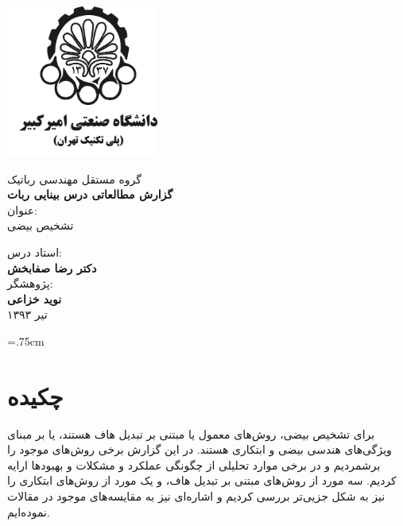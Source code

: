 \documentclass[12pt,a4paper]{article}
\numberwithin{equation}{section}
\numberwithin{figure}{section}
\newcommand{\nocontentsline}[3]{}
\newcommand{\tocless}[2]{\bgroup\let\addcontentsline=\nocontentsline#1{#2}\egroup}
\theoremstyle{definition}
\theoremstyle{theorem}
\theoremstyle{definition}
\begin{document}
\thispagestyle{empty}
\vspace*{-28mm}
\centerline{\includegraphics[height=5cm]{logo.png}}
\begin{center}
\vspace{-6mm}

گروه مستقل مهندسی رباتیک
\\[1.5cm]

{\large
\textbf { 
گزارش مطالعاتی درس بینایی ربات
}
\\[1.2cm]
عنوان:
\\[.4cm]
}
\baselineskip=1cm
{\Large \titr
تشخیص بیضی
\\[1cm]
}

{\Large \titr
{}
\vspace{-9mm}
}

{\large
استاد درس:
}
\\[.3cm]
\textbf{\large {\nastaliq دکتر رضا صفابخش}}
\\[.5cm]

{\large
 پژوهشگر:
}
\\[.3cm]
\textbf{\large {\nastaliq نوید خزاعی}}
\\[.5cm]
{\large
تیر ۱۳۹۳
}
\end{center}
\newpage
\baselineskip=1cm

\baselineskip=.75cm
\newpage 
{}
\tocless {\section*}{چکیده}

برای تشخیص بیضی، روش‌های معمول یا مبتنی بر تبدیل هاف هستند، یا بر مبنای ویژگی‌های هندسی بیضی و ابتکاری هستند. در این گزارش برخی روش‌های موجود را برشمردیم و در برخی موارد تحلیلی از چگونگی عملکرد و مشکلات و بهبودها ارایه کردیم. سه مورد از روش‌های مبتنی بر تبدیل هاف، و یک مورد از روش‌های ابتکاری را نیز به شکل جزیی‌تر بررسی کردیم و اشاره‌ای نیز به مقایسه‌های موجود در مقالات نموده‌ایم. 
\end{document}
